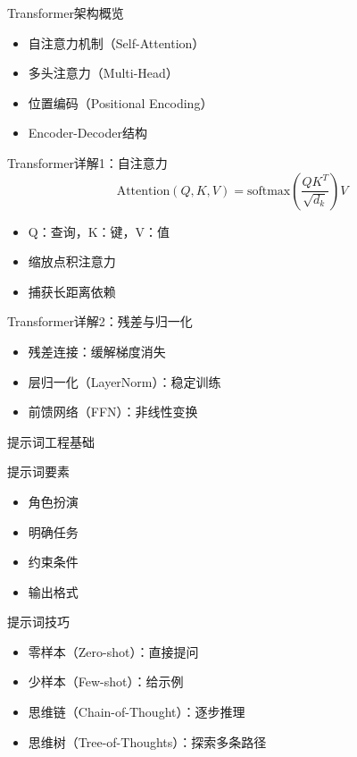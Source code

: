 \begin{frame}{Transformer架构概览}
\begin{itemize}
    \item 自注意力机制（Self-Attention）
    \item 多头注意力（Multi-Head）
    \item 位置编码（Positional Encoding）
    \item Encoder-Decoder结构
\end{itemize}
\end{frame}

\begin{frame}{Transformer详解1：自注意力}
\[
\text{Attention}(Q,K,V) = \text{softmax}\left(\frac{QK^T}{\sqrt{d_k}}\right)V
\]
\begin{itemize}
    \item Q：查询，K：键，V：值
    \item 缩放点积注意力
    \item 捕获长距离依赖
\end{itemize}
\end{frame}

\begin{frame}{Transformer详解2：残差与归一化}
\begin{itemize}
    \item 残差连接：缓解梯度消失
    \item 层归一化（LayerNorm）：稳定训练
    \item 前馈网络（FFN）：非线性变换
\end{itemize}
\end{frame}

\begin{frame}{提示词工程基础}
\begin{block}{提示词要素}
\begin{itemize}
    \item 角色扮演
    \item 明确任务
    \item 约束条件
    \item 输出格式
\end{itemize}
\end{block}
\end{frame}

\begin{frame}{提示词技巧}
\begin{itemize}
    \item 零样本（Zero-shot）：直接提问
    \item 少样本（Few-shot）：给示例
    \item 思维链（Chain-of-Thought）：逐步推理
    \item 思维树（Tree-of-Thoughts）：探索多条路径
\end{itemize}
\end{frame}


